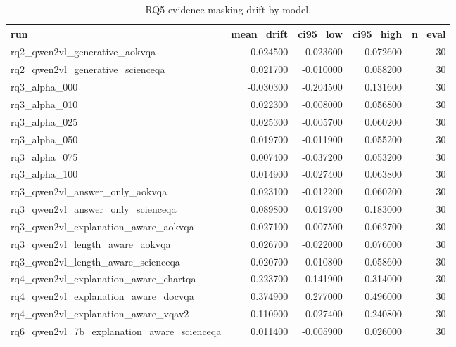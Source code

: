 \begin{table}
\caption{RQ5 evidence-masking drift by model.}
\label{tab:rq5_faithfulness}
\begin{tabular}{lrrrr}
\toprule
run & mean_drift & ci95_low & ci95_high & n_eval \\
\midrule
rq2_qwen2vl_generative_aokvqa & 0.024500 & -0.023600 & 0.072600 & 30 \\
rq2_qwen2vl_generative_scienceqa & 0.021700 & -0.010000 & 0.058200 & 30 \\
rq3_alpha_000 & -0.030300 & -0.204500 & 0.131600 & 30 \\
rq3_alpha_010 & 0.022300 & -0.008000 & 0.056800 & 30 \\
rq3_alpha_025 & 0.025300 & -0.005700 & 0.060200 & 30 \\
rq3_alpha_050 & 0.019700 & -0.011900 & 0.055200 & 30 \\
rq3_alpha_075 & 0.007400 & -0.037200 & 0.053200 & 30 \\
rq3_alpha_100 & 0.014900 & -0.027400 & 0.063800 & 30 \\
rq3_qwen2vl_answer_only_aokvqa & 0.023100 & -0.012200 & 0.060200 & 30 \\
rq3_qwen2vl_answer_only_scienceqa & 0.089800 & 0.019700 & 0.183000 & 30 \\
rq3_qwen2vl_explanation_aware_aokvqa & 0.027100 & -0.007500 & 0.062700 & 30 \\
rq3_qwen2vl_length_aware_aokvqa & 0.026700 & -0.022000 & 0.076000 & 30 \\
rq3_qwen2vl_length_aware_scienceqa & 0.020700 & -0.010800 & 0.058600 & 30 \\
rq4_qwen2vl_explanation_aware_chartqa & 0.223700 & 0.141900 & 0.314000 & 30 \\
rq4_qwen2vl_explanation_aware_docvqa & 0.374900 & 0.277000 & 0.496000 & 30 \\
rq4_qwen2vl_explanation_aware_vqav2 & 0.110900 & 0.027400 & 0.240800 & 30 \\
rq6_qwen2vl_7b_explanation_aware_scienceqa & 0.011400 & -0.005900 & 0.026000 & 30 \\
\bottomrule
\end{tabular}
\end{table}
